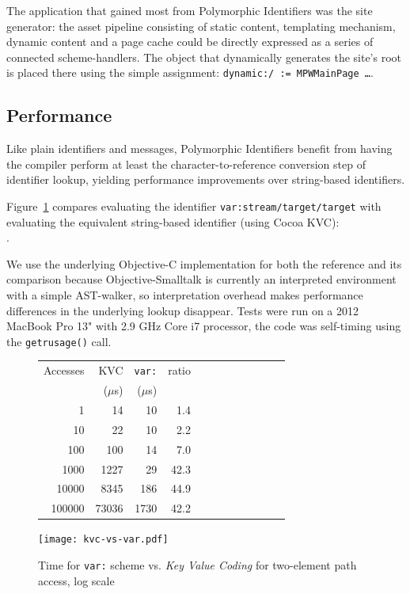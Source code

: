 \documentclass{acm_proc_article-sp}
\begin{document}
The application that gained most from Polymorphic Identifiers was the site generator:  the asset pipeline consisting of static
content, templating mechanism, dynamic content and a page cache could be directly expressed as a series of connected
scheme-handlers.  The object that dynamically generates the site's root is placed there using the simple assignment: {\tt dynamic:/  := MPWMainPage \dots}.


\subsection{Performance}

Like plain identifiers and messages, Polymorphic Identifiers benefit from having the compiler perform
at least the character-to-reference conversion step of identifier lookup, yielding performance 
improvements over string-based identifiers.

\sloppy
Figure~\ref{var-speed} compares evaluating the identifier {\tt var:stream/target/target} with evaluating the  
equivalent string-based identifier (using Cocoa KVC): \\  { . }
\fussy

We use the underlying Objective-C implementation for both the reference and its 
comparison because Objective-Smalltalk is currently an interpreted environment with
a simple AST-walker, so interpretation overhead makes performance differences in
the underlying lookup disappear.  Tests were run on a 2012 MacBook Pro 13" with 2.9 GHz Core i7 processor, the
code was self-timing using the {\tt getrusage()} call.  

\begin{figure}
\begin{minipage}[c]{0.38\textwidth}
\begin{tabular}{|r|r|r|r|r|r|r|r|r|r|r|r|} \hline
Accesses  & KVC& {\tt var:}   & ratio	\\ 
 & ($\mu$s) & ($\mu$s) & \\ \hline
1 & 14 & 10 & 1.4   \\ %
10 & 22 & 10 &   2.2 \\   %
100 & 100 & 14 &  7.0\\   %
1000 & 1227 & 29 &  42.3  \\  %
10000 & 8345 & 186 &   44.9 \\   %
100000 & 73036 & 1730 &    42.2 \\ \hline
\end{tabular}
\end{minipage}
\begin{minipage}[c]{0.39\textwidth}
\texttt{[image: kvc-vs-var.pdf]}
\end{minipage}
\vspace{-2.0em}
\caption{Time for  {\tt var:} scheme vs. \emph{Key Value Coding} for two-element path access, log scale}
\label{var-speed}
\end{figure}
\end{document}
